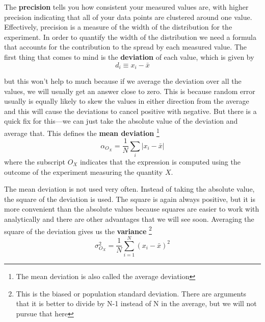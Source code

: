 The \textbf{precision} tells you how consistent your measured values are, with higher precision indicating that all of your data points are clustered around one value. Effectively, precision is a measure of the width of the distribution for the experiment. In order to quantify the width of the distribution we need a formula that accounts for the contribution to the spread by each measured value. The first thing that comes to mind is the \textbf{deviation} of each value, which is given by 
\begin{equation} d_i \equiv x_i - \bar{x} \end{equation}

but this won't help to much because if we average the deviation over all the values, we will usually get an answer close to zero. This is because random error usually is equally likely to skew the values in either direction from the average and this will cause the deviations to cancel positive with negative. But there is a quick fix for this---we can just take the absolute value of the deviation and average that. This defines the \textbf{mean deviation} \footnote{The mean deviation is also called the average deviation}
\begin{equation} \alpha_{O_X} = \frac{1}{N} \sum_i |x_i - \bar{x}| \end{equation}
where the subscript $O_X$ indicates that the expression is computed using the outcome of the experiment measuring the quantity $X$.

The mean deviation is not used very often. Instead of taking the absolute value, the square of the deviation is used. The square is again always positive, but it is more convenient than the absolute values because squares are easier to work with analytically and there are other advantages that we will see soon. Averaging the square of the deviation gives us the \textbf{ variance} 
\footnote{This is the biased or population standard deviation. There are arguments that it is better to divide by N-1 instead of N in the average, but we will not pursue that here}
\begin{equation}\sigma^2_{O_X} = \frac{1}{N} \sum_{i=1}^N \left(x_i - \bar{x}\right)^2  \end{equation}
%

